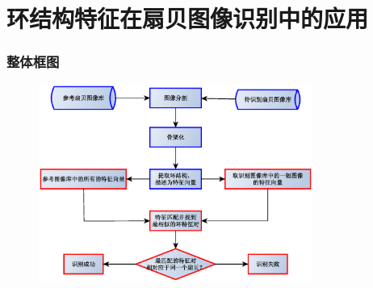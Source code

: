 \documentclass[notheorems,mathserif,table,compress]{beamer}  %
\begin{document}
\section{环结构特征在扇贝图像识别中的应用}

\begin{frame}
\frametitle{整体框图}
\begin{figure}
  \centering
  \includegraphics[width=0.8\textwidth]{chap04/scallop-framework}
\end{figure}
\end{frame}
\end{document}
